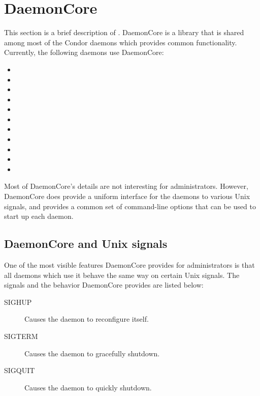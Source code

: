 
\section{\label{sec:DaemonCore}DaemonCore}

This section is a brief description of .  DaemonCore
is a library that is shared among most of the Condor daemons which
provides common functionality.  Currently, the following daemons use
DaemonCore:

\begin{itemize}
\item {}
\item {}
\item {}
\item {}
\item {}
\item {}
\item {}
\item {}
\item {}
\item {}
\item {}
\end{itemize}

Most of DaemonCore's details are not interesting for administrators.
However, DaemonCore does provide a uniform interface for the daemons
to various Unix signals, and provides a common set of command-line
options that can be used to start up each daemon.

\subsection{\label{sec:DaemonCore-Signals}DaemonCore and Unix signals}

One of the most visible features DaemonCore provides for
administrators is that all daemons which use it behave the same way on
certain Unix signals.  The signals and the behavior DaemonCore
provides are listed below:

\begin{description}
\item[SIGHUP] Causes the daemon to reconfigure itself.
\item[SIGTERM] Causes the daemon to gracefully shutdown.
\item[SIGQUIT] Causes the daemon to quickly shutdown.
\end{description}

